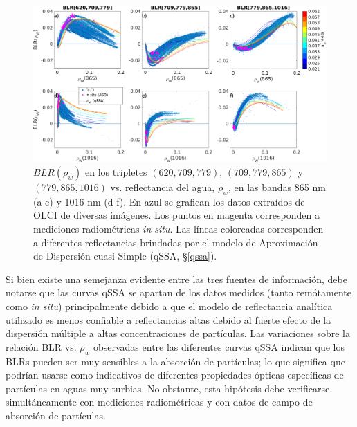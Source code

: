         \begin{figure}
        \centering
        \includegraphics[width=\textwidth]{blr/figures/blrVsrhoWCalDSqSSAinSitu}
        \caption[$BLR(\rho_{w})$ en los tripletes $(620,709,779)$, $(709,779,865)$ y $(779,865,1016)$ vs. reflectancia del agua, $\rho_{w}$, en las bandas 865 nm (a-c) y 1016 nm (d-f).]{$BLR(\rho_{w})$ en los tripletes $(620,709,779)$, $(709,779,865)$ y $(779,865,1016)$ vs. reflectancia del agua, $\rho_{w}$, en las bandas 865 nm (a-c) y 1016 nm (d-f). En azul se grafican los datos extraídos de OLCI de diversas imágenes. Los puntos en magenta corresponden a mediciones radiométricas \textit{in situ}. Las líneas coloreadas corresponden a diferentes reflectancias brindadas por el modelo de Aproximación de Dispersión cuasi-Simple (qSSA, \S \ref{qssa}).}
        \label{blr:blrVsRho}
        \end{figure}
        
        Si bien existe una semejanza evidente entre las tres fuentes de información, debe notarse que las curvas qSSA se apartan de los datos medidos (tanto remótamente como \textit{in situ}) principalmente debido a que el modelo de reflectancia analítica utilizado es menos confiable a reflectancias altas debido al fuerte efecto de la dispersión múltiple a altas concentraciones de partículas.
        Las variaciones sobre la relación BLR vs. $\rho_{w}$ observadas entre las diferentes curvas qSSA indican que los BLRs pueden ser muy sensibles a la absorción de partículas; lo que significa que podrían usarse como indicativos de diferentes propiedades ópticas específicas de partículas en aguas muy turbias. No obstante, esta hipótesis debe verificarse simultáneamente con mediciones radiométricas y con datos de campo de absorción de partículas.
        

